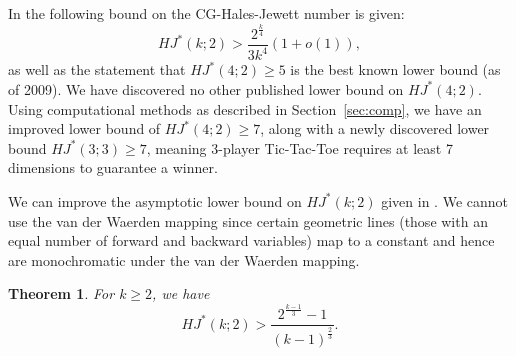 \documentclass[11pt]{article}
\newtheorem{thm}{Theorem}
\theoremstyle{definition}
\begin{document}
In \cite{BPV} the following
bound on the CG-Hales-Jewett number is given: 
$$HJ^*(k;2) > \frac{2^{\frac{k}{4}}}{3k^4}(1+o(1)),$$ 
as well
as the statement that $HJ^*(4;2)\geq 5 $ is the best known lower bound (as of 2009).
We have discovered no other published lower bound on $HJ^*(4;2)$. Using computational methods as described in Section~\ref{sec:comp}, we have an improved lower bound of $HJ^*(4;2) \geq 7$, along with a newly discovered lower bound  $HJ^*(3;3)\geq 7$, meaning 3-player Tic-Tac-Toe requires at least 7 dimensions
to guarantee a winner.  






We can improve the asymptotic lower bound 
on $HJ^*(k;2)$ given in \cite{BPV}.  We cannot use the  van der Waerden mapping   since certain geometric lines
(those with an equal number of forward and backward variables) map to a constant and hence
are monochromatic under the van der Waerden mapping.

\begin{thm} For $k \geq 2$, we have
$$
HJ^*(k;2) > \frac{2^{\frac{k-1}{3}}-1}{(k-1)^{\frac23}}.
$$
\end{thm}
\end{document}
